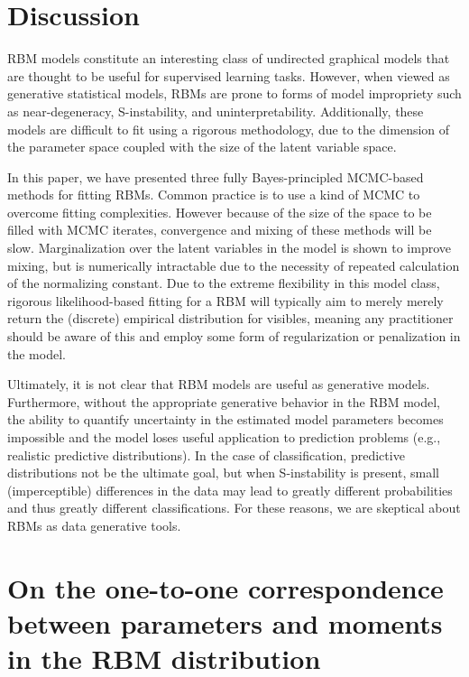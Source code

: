 \documentclass[12pt]{article}
\theoremstyle{definition}
\begin{document}
\section{Discussion}\label{discussion}

RBM models constitute an interesting class of undirected graphical
models that are thought to be useful for supervised learning tasks.
However, when viewed as generative statistical models, RBMs are prone to
forms of model impropriety such as near-degeneracy, S-instability, and
uninterpretability. Additionally, these models are difficult to fit
using a rigorous methodology, due to the dimension of the parameter
space coupled with the size of the latent variable space.

In this paper, we have presented three fully Bayes-principled MCMC-based
methods for fitting RBMs. Common practice is to use a kind of MCMC to
overcome fitting complexities. However because of the size of the space
to be filled with MCMC iterates, convergence and mixing of these methods
will be slow. Marginalization over the latent variables in the model is
shown to improve mixing, but is numerically intractable due to the
necessity of repeated calculation of the normalizing constant. Due to
the extreme flexibility in this model class, rigorous likelihood-based
fitting for a RBM will typically aim to merely merely return the
(discrete) empirical distribution for visibles, meaning any practitioner
should be aware of this and employ some form of regularization or
penalization in the model.

Ultimately, it is not clear that RBM models are useful as generative
models. Furthermore, without the appropriate generative behavior in the
RBM model, the ability to quantify uncertainty in the estimated model
parameters becomes impossible and the model loses useful application to
prediction problems (e.g., realistic predictive distributions). In the
case of classification, predictive distributions not be the ultimate
goal, but when S-instability is present, small (imperceptible)
differences in the data may lead to greatly different probabilities and
thus greatly different classifications. For these reasons, we are
skeptical about RBMs as data generative tools.

\clearpage

\appendix


\section{On the one-to-one correspondence between parameters and moments
in the RBM distribution}\label{appendix-rbm}
\end{document}
